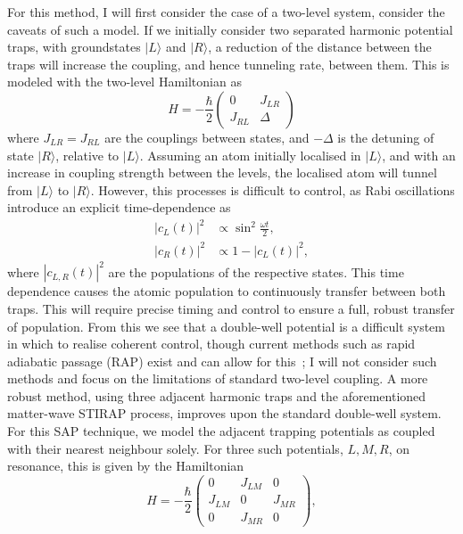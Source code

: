 For this method, I will first consider the case of a two-level system, consider the caveats of such a model. If we initially consider two separated harmonic potential traps, with groundstates $| L \rangle$ and $| R \rangle$, a reduction of the distance between the traps will increase the coupling, and hence tunneling rate, between them. This is modeled with the two-level Hamiltonian as
\begin{equation}
    H = -\frac{\hbar}{2}
    \begin{pmatrix}
        0 & J_{LR} \\
        J_{RL} & \Delta
    \end{pmatrix}
\end{equation}
where $J_{LR} = J_{RL}$ are the couplings between states, and $-\Delta$ is the detuning of state $| R \rangle$, relative to $| L \rangle$. Assuming an atom initially localised in $| L \rangle$, and with an increase in coupling strength between the levels, the localised atom will tunnel from $| L \rangle$ to $| R \rangle $. However, this processes is difficult to control, as Rabi oscillations introduce an explicit time-dependence as
\begin{subequations}
\begin{align}
    |c_L(t)|^2 &\propto \sin^2 \frac{\omega t}{2} ,\\
    |c_R(t)|^2 &\propto 1 - |c_L(t)|^2,
\end{align}
\end{subequations}
where $|c_{L,R}(t)|^2$ are the populations of the respective states. This time dependence causes the atomic population to continuously transfer between both traps. This will require precise timing and control to ensure a full, robust transfer of population. From this we see that a double-well potential is a difficult system in which to realise coherent control, though current methods such as rapid adiabatic passage (RAP) exist and can allow for this~\cite{rap}; I will not consider such methods and focus on the limitations of standard two-level coupling. A more robust method, using three adjacent harmonic traps and the aforementioned matter-wave STIRAP process, improves upon the standard double-well system. For this SAP technique, we model the adjacent trapping potentials as coupled with their nearest neighbour solely. For three such potentials, $L,M,R$, on resonance, this is given by the Hamiltonian
\begin{equation}\label{eqn:sap_ham}
    H = -\frac{\hbar}{2}
    \begin{pmatrix}
        0 & J_{LM} & 0 \\
        J_{LM} & 0 & J_{MR} \\
        0 & J_{MR} & 0
    \end{pmatrix},
\end{equation}
